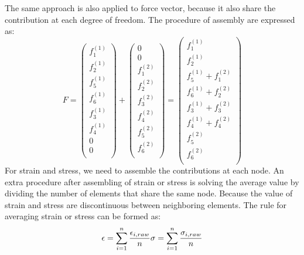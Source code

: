 The same approach is also applied to force vector, because it also share the contribution at each degree of freedom. The procedure of assembly are expressed as:
\begin{equation}
F =  \begin{pmatrix}
f_1^{\left(1\right)} \\
f_2^{\left(1\right)} \\
f_5^{\left(1\right)} \\ 
f_6^{\left(1\right)} \\ 
f_3^{\left(1\right)} \\
f_4^{\left(1\right)} \\
0 \\ 
0 \\ 
\end{pmatrix} +  \begin{pmatrix}
0 \\ 
0 \\ 
f_1^{\left(2\right)} \\
f_2^{\left(2\right)} \\
f_3^{\left(2\right)} \\ 
f_4^{\left(2\right)} \\ 
f_5^{\left(2\right)} \\
f_6^{\left(2\right)} \\
\end{pmatrix} = \begin{pmatrix}
f_1^{\left(1\right)} \\
f_2^{\left(1\right)} \\
f_5^{\left(1\right)}+ f_1^{\left(2\right)} \\ 
f_6^{\left(1\right)}+ f_2^{\left(2\right)} \\ 
f_3^{\left(1\right)}+ f_3^{\left(2\right)}\\
f_4^{\left(1\right)}+ f_4^{\left(2\right)} \\
f_5^{\left(2\right)} \\ 
f_6^{\left(2\right)}  \\ 
\end{pmatrix} 
\end{equation}
For strain and stress, we need to assemble the contributions at each node. An extra procedure after assembling of strain or stress is solving the average value by dividing the number of elements that share the same node. Because the value of strain and stress are discontinuous between neighboring elements. The rule for averaging strain or stress can be formed as:
\begin{equation}
\epsilon = \displaystyle\sum_{i=1}^{n} \frac{\epsilon_{i,raw}}{n}
\\
\sigma = \displaystyle\sum_{i=1}^{n} \frac{\sigma_{i,raw}}{n}
\end{equation} 



